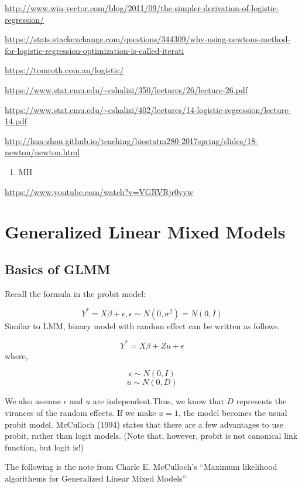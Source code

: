 \documentclass[]{book}
\providecommand{\tightlist}{%
  \setlength{\itemsep}{0pt}\setlength{\parskip}{0pt}}
\begin{document}
\url{http://www.win-vector.com/blog/2011/09/the-simpler-derivation-of-logistic-regression/}

\url{https://stats.stackexchange.com/questions/344309/why-using-newtons-method-for-logistic-regression-optimization-is-called-iterati}

\url{https://tomroth.com.au/logistic/}

\url{https://www.stat.cmu.edu/~cshalizi/350/lectures/26/lecture-26.pdf}

\url{https://www.stat.cmu.edu/~cshalizi/402/lectures/14-logistic-regression/lecture-14.pdf}

\url{http://hua-zhou.github.io/teaching/biostatm280-2017spring/slides/18-newton/newton.html}

\begin{enumerate}
\def\labelenumi{\arabic{enumi}.}
\setcounter{enumi}{2}
\tightlist
\item
  MH
\end{enumerate}

\url{https://www.youtube.com/watch?v=VGRVRjr0vyw}

\hypertarget{generalized-linear-mixed-models}{%
\chapter{Generalized Linear Mixed Models}\label{generalized-linear-mixed-models}}

\hypertarget{basics-of-glmm}{%
\section{Basics of GLMM}\label{basics-of-glmm}}

Recall the formula in the probit model:

\[Y^*=X\beta+\epsilon, \epsilon \sim N(0,\sigma^2)=N(0,I)\]
Similar to LMM, binary model with random effect can be written as follows.

\[Y^*=X\beta+ Z u+\epsilon\]
where,

\[\epsilon \sim N(0,I)\]
\[u \sim N(0, D)\]

We also assume \(\epsilon\) and \(u\) are independent.Thus, we know that \(D\) represents the virances of the random effects. If we make \(u =1\), the model becomes the usual probit model. McCulloch (1994) states that there are a few advantages to use probit, rather than logit models. (Note that, however, probit is not canonical link function, but logit is!)

The following is the note from Charle E. McCulloch's ``Maximum likelihood algorithems for Generalized Linear Mixed Models''
\end{document}
